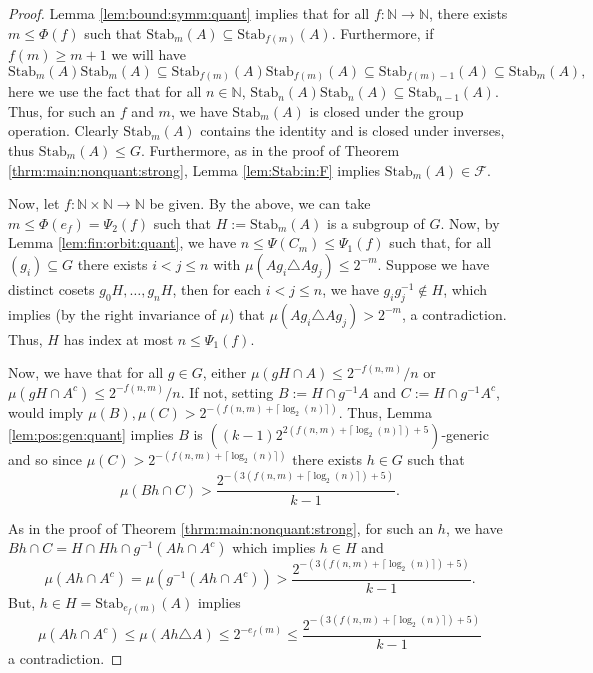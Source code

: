 \documentclass[11pt]{amsart}
\theoremstyle{definition}
\theoremstyle{remark}
\def\NN{\mathbb{N}}
\begin{document}
\begin{proof}
    Lemma \ref{lem:bound:symm:quant} implies that for all $f: \NN \to \NN$, there exists $m \le \Phi(f)$ such that $\mathrm{Stab}_m(A) \subseteq \mathrm{Stab}_{f(m)}(A)$. Furthermore, if $f(m) \ge m+1$ we will have 
    \[
    \mathrm{Stab}_m(A)\mathrm{Stab}_m(A)\subseteq \mathrm{Stab}_{f(m)}(A)\mathrm{Stab}_{f(m)}(A) \subseteq \mathrm{Stab}_{f(m)-1}(A)\subseteq \mathrm{Stab}_{m}(A),
    \]
    here we use the fact that for all $n \in \NN$, $\mathrm{Stab}_{n}(A)\mathrm{Stab}_{n}(A) \subseteq \mathrm{Stab}_{n-1}(A)$. Thus, for such an $f$ and $m$, we have $\mathrm{Stab}_m(A)$ is closed under the group operation. Clearly $\mathrm{Stab}_m(A)$ contains the identity and is closed under inverses, thus $\mathrm{Stab}_m(A) \le G$. Furthermore, as in the proof of Theorem \ref{thrm:main:nonquant:strong}, Lemma \ref{lem:Stab:in:F} implies $\mathrm{Stab}_m(A) \in \mathcal{F}$.

    Now, let $f:\NN \times \NN \to \NN$ be given. By the above, we can take $m \le \Phi(e_f)= \Psi_2(f)$ such that $H:= \mathrm{Stab}_m(A)$ is a subgroup of $G$. Now, by Lemma \ref{lem:fin:orbit:quant}, we have $n \le \Psi(C_m) \le \Psi_1(f)$ such that, for all $(g_i) \subseteq G$ there exists $i<j\le n$ with $\mu(Ag_i \triangle Ag_j) \le 2^{-m}$. Suppose we have distinct cosets $g_0H,\ldots, g_nH$, then for each $i<j\le n$, we have $g_ig_j^{-1} \notin H$, which implies (by the right invariance of $\mu$) that $\mu(Ag_i \triangle Ag_j) > 2^{-m}$, a contradiction. Thus, $H$ has index at most $n \le \Psi_1(f)$.

Now, we have that for all $g \in G$, either $\mu(gH \cap A) \le 2^{-f(n,m)}/n$ or  $\mu(gH \cap A^c) \le 2^{-f(n,m)}/n$. If not, setting $B:=H \cap g^{-1}A$ and $C:=H \cap g^{-1}A^c$, would imply $\mu(B), \mu(C) >  2^{-(f(n,m)+\lceil\log_2(n)\rceil)}$. Thus, Lemma \ref{lem:pos:gen:quant} implies $B$ is $((k-1)2^{2(f(n,m)+\lceil\log_2(n)\rceil)+5})$-generic and so since $\mu(C)>2^{-(f(n,m)+\lceil\log_2(n)\rceil)}$ there exists $h \in G$ such that
\[
\mu(Bh \cap C)> \frac{2^{-(3(f(n,m)+\lceil\log_2(n)\rceil) + 5)}}{k-1}.
\]

As in the proof of Theorem \ref{thrm:main:nonquant:strong}, for such an $h$, we have $Bh \cap C = H \cap Hh \cap g^{-1}(Ah \cap A^c)$ which implies  $h \in H$ and 
\[
\mu(Ah \cap A^c)=\mu(g^{-1}(Ah \cap A^c))> \frac{2^{-(3(f(n,m)+\lceil\log_2(n)\rceil) + 5)}}{k-1}.
\]
But, $h \in H  = \mathrm{Stab}_{e_f(m)}(A)$ implies
\[
\mu(Ah \cap A^c) \le \mu(Ah \triangle A)\le 2^{-e_f(m)} \le\frac{2^{-(3(f(n,m)+\lceil\log_2(n)\rceil) + 5)}}{k-1}
\]
a contradiction.


\end{proof}
\end{document}
